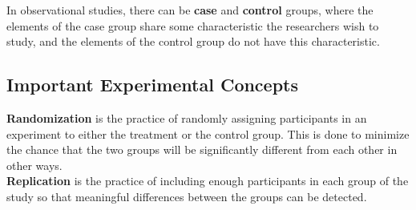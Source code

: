 \documentclass[12pt,openany]{book}
\begin{document}
	\noindent In observational studies, there can be \textbf{case} and \textbf{control} groups, where the elements of the case group share some characteristic the researchers wish to study, and the elements of the control group do not have this characteristic.

	\subsection{Important Experimental Concepts}

	\noindent \textbf{Randomization} is the practice of randomly assigning participants in an experiment to either the treatment or the control group. This is done to minimize the chance that the two groups will be significantly different from each other in other ways.\\

	\noindent \textbf{Replication} is the practice of including enough participants in each group of the study so that meaningful differences between the groups can be detected.
\end{document}
